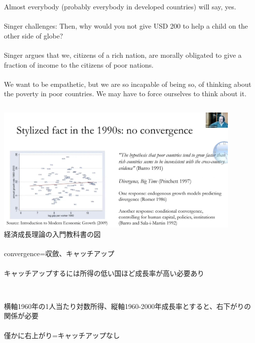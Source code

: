 \begin{frame}{}
Almost everybody (probably everybody in developed countries) will say, yes. \\~\\

Singer challenges: Then, why would you not give USD 200 to help a child on the other side of globe?\\~\\

Singer argues that we, citizens of a rich nation, are morally obligated to give a fraction of income to the citizens of poor nations. \\~\\

We want to be empathetic, but we are so incapable of being so, of thinking about the poverty in poor countries. We may have to force ourselves to think about it.
\end{frame}

\begin{frame}[label = NonConvergence]{}
\begin{columns}[T]
\includegraphics[width=12cm]{1/NonConvergence.jpg}\\
経済成長理論の入門教科書の図\\~\\
convergence=収斂、キャッチアップ\\~\\
\pause
キャッチアップするには所得の低い国ほど成長率が高い必要あり\\~\\
\end{columns}
\pause
横軸1960年の1人当たり対数所得、縦軸1960-2000年成長率とすると、右下がりの関係が必要\\~\\
\pause
僅かに右上がり=キャッチアップなし
\end{frame}

